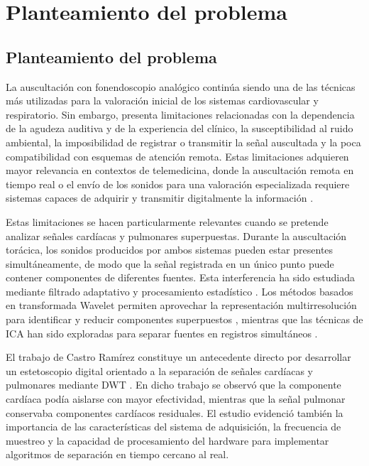 \chapter{Planteamiento del problema}\label{planteamiento}

\section{Planteamiento del problema}

La auscultación con fonendoscopio analógico continúa siendo una de las técnicas más utilizadas para la valoración inicial de los sistemas cardiovascular y respiratorio. Sin embargo, presenta limitaciones relacionadas con la dependencia de la agudeza auditiva y de la experiencia del clínico, la susceptibilidad al ruido ambiental, la imposibilidad de registrar o transmitir la señal auscultada y la poca compatibilidad con esquemas de atención remota. Estas limitaciones adquieren mayor relevancia en contextos de telemedicina, donde la auscultación remota en tiempo real o el envío de los sonidos para una valoración especializada requiere sistemas capaces de adquirir y transmitir digitalmente la información \cite{MedlinePlusAuscultacion2025,Littmann2020}.

Estas limitaciones se hacen particularmente relevantes cuando se pretende analizar señales cardíacas y pulmonares superpuestas. Durante la auscultación torácica, los sonidos producidos por ambos sistemas pueden estar presentes simultáneamente, de modo que la señal registrada en un único punto puede contener componentes de diferentes fuentes. Esta interferencia ha sido estudiada mediante filtrado adaptativo y procesamiento estadístico . Los métodos basados en transformada Wavelet permiten aprovechar la representación multirresolución para identificar y reducir componentes superpuestos , mientras que las técnicas de ICA han sido exploradas para separar fuentes en registros simultáneos .

El trabajo de Castro Ramírez constituye un antecedente directo por desarrollar un estetoscopio digital orientado a la separación de señales cardíacas y pulmonares mediante DWT . En dicho trabajo se observó que la componente cardíaca podía aislarse con mayor efectividad, mientras que la señal pulmonar conservaba componentes cardíacos residuales. El estudio evidenció también la importancia de las características del sistema de adquisición, la frecuencia de muestreo y la capacidad de procesamiento del hardware para implementar algoritmos de separación en tiempo cercano al real.

